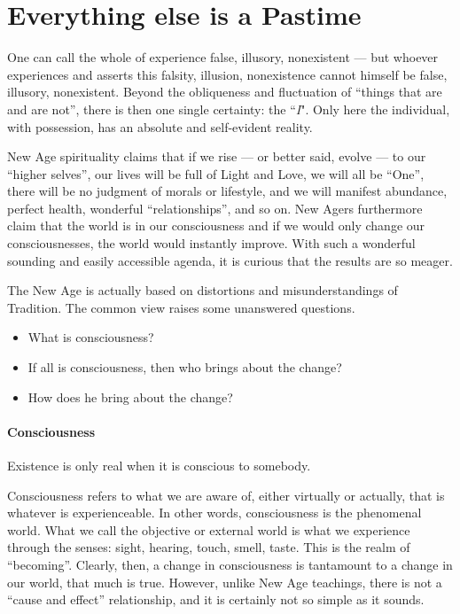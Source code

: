 \section{Everything else is a Pastime}

\begin{quotex}
One can call the whole of experience false, illusory, nonexistent — but whoever experiences and asserts this falsity, illusion, nonexistence cannot himself be false, illusory, nonexistent. Beyond the obliqueness and fluctuation of “things that are and are not”, there is then one single certainty: the “\emph{I}". Only here the individual, with possession, has an absolute and self-evident reality. 

\end{quotex}
New Age spirituality claims that if we rise — or better said, evolve — to our “higher selves”, our lives will be full of Light and Love, we will all be “One”, there will be no judgment of morals or lifestyle, and we will manifest abundance, perfect health, wonderful “relationships”, and so on. New Agers furthermore claim that the world is in our consciousness and if we would only change our consciousnesses, the world would instantly improve. With such a wonderful sounding and easily accessible agenda, it is curious that the results are so meager.

The New Age is actually based on distortions and misunderstandings of Tradition. The common view raises some unanswered questions.

\begin{itemize}
\item What is consciousness? 
\item If all is consciousness, then who brings about the change? 
\item How does he bring about the change? 
\end{itemize}
\paragraph{Consciousness}
\begin{quotex}
Existence is only real when it is conscious to somebody. 

\end{quotex}
Consciousness refers to what we are aware of, either virtually or actually, that is whatever is experienceable. In other words, consciousness is the phenomenal world. What we call the objective or external world is what we experience through the senses: sight, hearing, touch, smell, taste. This is the realm of “becoming”. Clearly, then, a change in consciousness is tantamount to a change in our world, that much is true. However, unlike New Age teachings, there is not a “cause and effect” relationship, and it is certainly not so simple as it sounds.

